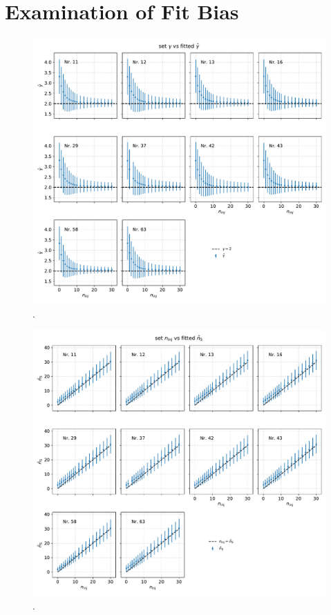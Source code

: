 \section{Examination of Fit Bias}

\begin{figure}
    \centering
    \includegraphics[width=\linewidth]{Plots/05_csky/gamma_fit_time_dep.pdf}
    \caption{.}
    \label{fig:gamma_fit_time_dep}
\end{figure}

\begin{figure}
    \centering
    \includegraphics[width=\linewidth]{Plots/05_csky/ns_fit_time_dep.pdf}
    \caption{.}
    \label{fig:ns_fit_time_dep}
\end{figure}
